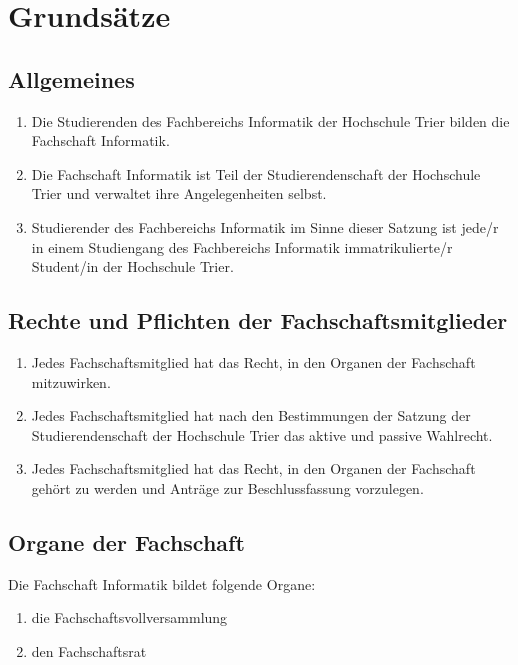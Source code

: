 \section{Grundsätze}

\singlespacing

\subsection{Allgemeines}
\begin{enumerate}
\item Die Studierenden des Fachbereichs Informatik der Hochschule Trier bilden die Fachschaft Informatik.
\item Die Fachschaft Informatik ist Teil der Studierendenschaft der Hochschule Trier und verwaltet ihre Angelegenheiten selbst.
\item Studierender des Fachbereichs Informatik im Sinne dieser Satzung ist jede/r in einem Studiengang des Fachbereichs Informatik immatrikulierte/r Student/in der Hochschule Trier.
\end{enumerate}

\subsection{Rechte und Pflichten der Fachschaftsmitglieder}
\begin{enumerate}
\item Jedes Fachschaftsmitglied hat das Recht, in den Organen der Fachschaft mitzuwirken.
\item Jedes Fachschaftsmitglied hat nach den Bestimmungen der Satzung der Studierendenschaft der Hochschule Trier das aktive und passive Wahlrecht.
\item Jedes Fachschaftsmitglied hat das Recht, in den Organen der Fachschaft gehört zu werden und Anträge zur Beschlussfassung vorzulegen.
\end{enumerate}

\subsection{Organe der Fachschaft}
Die Fachschaft Informatik bildet folgende Organe:
\begin{enumerate}
\item die Fachschaftsvollversammlung
\item den Fachschaftsrat
\end{enumerate}
